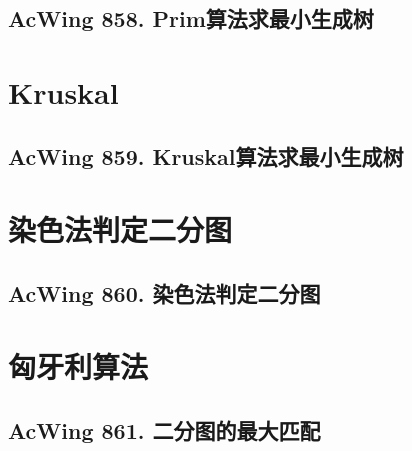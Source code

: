 \subsection{AcWing 858. Prim算法求最小生成树}

\section{Kruskal}
\subsection{AcWing 859. Kruskal算法求最小生成树}

\section{染色法判定二分图}
\subsection{AcWing 860. 染色法判定二分图}

\section{匈牙利算法}
\subsection{AcWing 861. 二分图的最大匹配}
